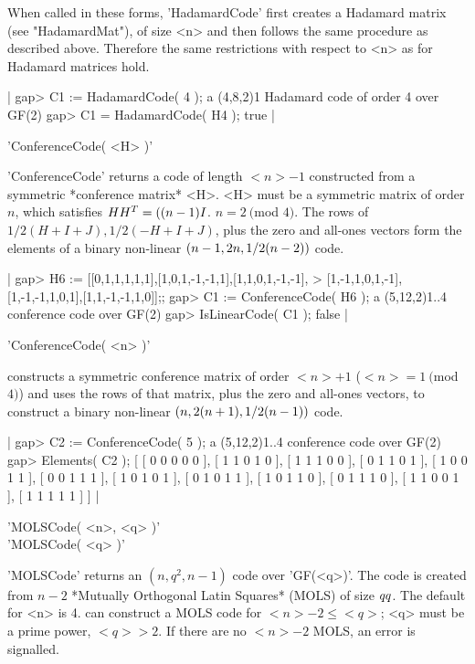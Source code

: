 When called   in these  forms,  'HadamardCode' first  creates a  Hadamard
matrix (see  "HadamardMat"),   of size  <n>  and  then follows  the  same
procedure as   described above.  Therefore  the  same  restrictions  with
respect to <n> as for Hadamard matrices hold.

|    gap> C1 := HadamardCode( 4 );
    a (4,8,2)1 Hadamard code of order 4 over GF(2)
    gap> C1 = HadamardCode( H4 );
    true |


'ConferenceCode( <H> )'

'ConferenceCode'   returns a code  of length  $<n>-1$  constructed from a
symmetric *conference matrix*  <H>.  <H> must be   a symmetric matrix  of
order $n$, which satisfies $H\*H^T = ((n-1)\*I$. $n =  2\ ($mod $4)$. The
rows  of $1/2(H+I+J), 1/2(-H+I+J)$,  plus  the zero  and all-ones vectors
form  the elements of   a binary non-linear $(n-1,   2\*n, 1/2 \* (n-2))$
code.

|    gap> H6 := [[0,1,1,1,1,1],[1,0,1,-1,-1,1],[1,1,0,1,-1,-1],
    > [1,-1,1,0,1,-1],[1,-1,-1,1,0,1],[1,1,-1,-1,1,0]];;
    gap> C1 := ConferenceCode( H6 );
    a (5,12,2)1..4 conference code over GF(2)
    gap> IsLinearCode( C1 );
    false |

'ConferenceCode( <n> )'

{\GUAVA} constructs a symmetric conference  matrix of order $<n>+1$ ($<n>
= 1\ ($mod  $4)$) and uses  the rows of that matrix,   plus the zero  and
all-ones vectors, to construct a binary  non-linear $(n, 2\*(n+1), 1/2 \*
(n-1))$ code.

|    gap> C2 := ConferenceCode( 5 );
    a (5,12,2)1..4 conference code over GF(2)
    gap> Elements( C2 );
    [ [ 0 0 0 0 0 ], [ 1 1 0 1 0 ], [ 1 1 1 0 0 ], [ 0 1 1 0 1 ],
      [ 1 0 0 1 1 ], [ 0 0 1 1 1 ], [ 1 0 1 0 1 ], [ 0 1 0 1 1 ],
      [ 1 0 1 1 0 ], [ 0 1 1 1 0 ], [ 1 1 0 0 1 ], [ 1 1 1 1 1 ] ] |


'MOLSCode( <n>, <q> )'\\
'MOLSCode( <q> )'

'MOLSCode' returns an  $(n, q^2, n-1)$ code over  'GF(<q>)'.  The code is
created from $n-2$ *Mutually Orthogonal  Latin Squares* (MOLS) of size $q
\* q$. The default for <n> is  4. {\GUAVA} can  construct a MOLS code for
$<n>-2 \leq <q>$; <q> must be a prime power, $<q>  > 2$.  If there are no
$<n>-2$ MOLS, an error is signalled.


